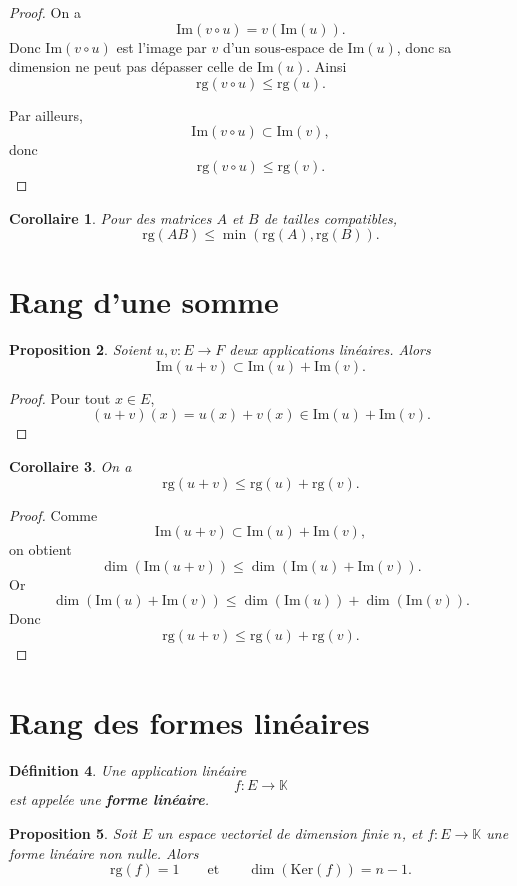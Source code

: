 \documentclass[11pt,a4paper]{article}
\newtheorem{definition}{Définition}[section]
\newtheorem{proposition}[definition]{Proposition}
\newtheorem{corollaire}[definition]{Corollaire}
\theoremstyle{remark}
\newcommand{\K}{\mathbb{K}}
\newcommand{\Ker}{\mathrm{Ker}}
\newcommand{\Img}{\mathrm{Im}}
\newcommand{\rg}{\mathrm{rg}}
\begin{document}
\begin{proof}
On a
\[
\Img(v\circ u)=v(\Img(u)).
\]
Donc \(\Img(v\circ u)\) est l’image par \(v\) d’un sous-espace de \(\Img(u)\), donc sa dimension ne peut pas dépasser celle de \(\Img(u)\). Ainsi
\[
\rg(v\circ u)\le \rg(u).
\]

Par ailleurs,
\[
\Img(v\circ u)\subset \Img(v),
\]
donc
\[
\rg(v\circ u)\le \rg(v).
\]
\end{proof}

\begin{corollaire}
Pour des matrices \(A\) et \(B\) de tailles compatibles,
\[
\rg(AB)\le \min(\rg(A),\rg(B)).
\]
\end{corollaire}

\section{Rang d’une somme}

\begin{proposition}
Soient \(u,v:E\to F\) deux applications linéaires. Alors
\[
\Img(u+v)\subset \Img(u)+\Img(v).
\]
\end{proposition}

\begin{proof}
Pour tout \(x\in E\),
\[
(u+v)(x)=u(x)+v(x)\in \Img(u)+\Img(v).
\]
\end{proof}

\begin{corollaire}
On a
\[
\rg(u+v)\le \rg(u)+\rg(v).
\]
\end{corollaire}

\begin{proof}
Comme
\[
\Img(u+v)\subset \Img(u)+\Img(v),
\]
on obtient
\[
\dim(\Img(u+v))\le \dim(\Img(u)+\Img(v)).
\]
Or
\[
\dim(\Img(u)+\Img(v))\le \dim(\Img(u))+\dim(\Img(v)).
\]
Donc
\[
\rg(u+v)\le \rg(u)+\rg(v).
\]
\end{proof}

\section{Rang des formes linéaires}

\begin{definition}
Une application linéaire
\[
f:E\to \K
\]
est appelée une \textbf{forme linéaire}.
\end{definition}

\begin{proposition}
Soit \(E\) un espace vectoriel de dimension finie \(n\), et \(f:E\to\K\) une forme linéaire non nulle. Alors
\[
\rg(f)=1
\qquad \text{et} \qquad
\dim(\Ker(f))=n-1.
\]
\end{proposition}
\end{document}

